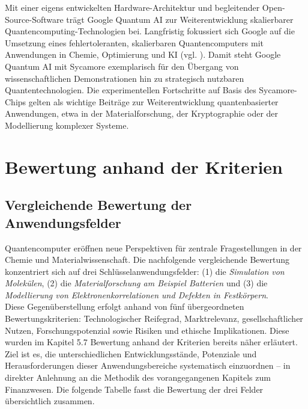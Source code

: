 \vspace{0.5em}

Mit einer eigens entwickelten Hardware-Architektur und begleitender Open-Source-Software trägt Google Quantum AI zur Weiterentwicklung skalierbarer Quantencomputing-Technologien bei. Langfristig fokussiert sich Google auf die Umsetzung eines fehlertoleranten, skalierbaren Quantencomputers mit Anwendungen in Chemie, Optimierung und KI (vgl. \cite{abughanem_full_2024}).
Damit steht Google Quantum AI mit Sycamore exemplarisch für den Übergang von wissenschaftlichen Demonstrationen hin zu strategisch nutzbaren Quantentechnologien. Die experimentellen Fortschritte auf Basis des Sycamore-Chips gelten als wichtige Beiträge zur Weiterentwicklung quantenbasierter Anwendungen, etwa in der Materialforschung, der Kryptographie oder der Modellierung komplexer Systeme.


\section{Bewertung anhand der Kriterien}
\label{Chemie_Bewertung}

\subsection{Vergleichende Bewertung der Anwendungsfelder}

Quantencomputer eröffnen neue Perspektiven für zentrale Fragestellungen in der Chemie und Materialwissenschaft. Die nachfolgende vergleichende Bewertung konzentriert sich auf drei Schlüsselanwendungsfelder: (1) die \textit{Simulation von Molekülen}, (2) die \textit{Materialforschung am Beispiel Batterien} und (3) die \textit{Modellierung von Elektronenkorrelationen und Defekten in Festkörpern}.
\newline\\
Diese Gegenüberstellung erfolgt anhand von fünf übergeordneten Bewertungskriterien: Technologischer Reifegrad, Marktrelevanz, gesellschaftlicher Nutzen, Forschungspotenzial sowie Risiken und ethische Implikationen. Diese wurden im Kapitel 5.7 Bewertung anhand der Kriterien bereits näher erläutert.
\newline\\
Ziel ist es, die unterschiedlichen Entwicklungsstände, Potenziale und Herausforderungen dieser Anwendungsbereiche systematisch einzuordnen – in direkter Anlehnung an die Methodik des vorangegangenen Kapitels zum Finanzwesen. Die folgende Tabelle fasst die Bewertung der drei Felder übersichtlich zusammen.

